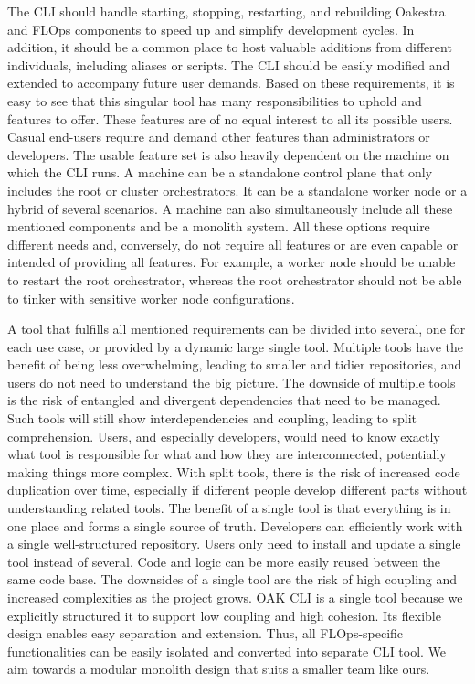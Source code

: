 The CLI should handle starting, stopping, restarting, and rebuilding Oakestra and FLOps components to speed up and simplify development cycles.
In addition, it should be a common place to host valuable additions from different individuals, including aliases or scripts.
The CLI should be easily modified and extended to accompany future user demands.
\vspace{5mm}
\newline
Based on these requirements, it is easy to see that this singular tool has many responsibilities to uphold and features to offer.
These features are of no equal interest to all its possible users.
Casual end-users require and demand other features than administrators or developers.
The usable feature set is also heavily dependent on the machine on which the CLI runs.
A machine can be a standalone control plane that only includes the root or cluster orchestrators.
It can be a standalone worker node or a hybrid of several scenarios.
A machine can also simultaneously include all these mentioned components and be a monolith system.
All these options require different needs and, conversely, do not require all features or are even capable or intended of providing all features.
For example, a worker node should be unable to restart the root orchestrator, whereas the root orchestrator should not be able to tinker with sensitive worker node configurations.

A tool that fulfills all mentioned requirements can be divided into several, one for each use case, or provided by a dynamic large single tool.
Multiple tools have the benefit of being less overwhelming, leading to smaller and tidier repositories, and users do not need to understand the big picture.
The downside of multiple tools is the risk of entangled and divergent dependencies that need to be managed.
Such tools will still show interdependencies and coupling, leading to split comprehension.
Users, and especially developers, would need to know exactly what tool is responsible for what and how they are interconnected, potentially making things more complex.
With split tools, there is the risk of increased code duplication over time, especially if different people develop different parts without understanding related tools.
The benefit of a single tool is that everything is in one place and forms a single source of truth.
Developers can efficiently work with a single well-structured repository.
Users only need to install and update a single tool instead of several.
Code and logic can be more easily reused between the same code base.
The downsides of a single tool are the risk of high coupling and increased complexities as the project grows.
OAK CLI is a single tool because we explicitly structured it to support low coupling and high cohesion.
Its flexible design enables easy separation and extension.
Thus, all FLOps-specific functionalities can be easily isolated and converted into separate CLI tool.
We aim towards a modular monolith design that suits a smaller team like ours.